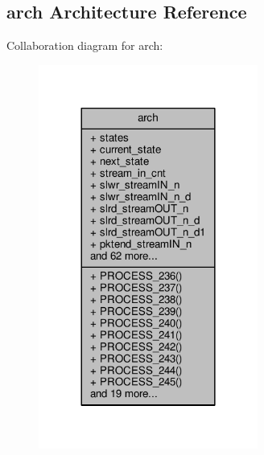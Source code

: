 \subsection{arch Architecture Reference}
\label{classslaveFIFO5b_1_1arch}


Collaboration diagram for arch\+:\nopagebreak
\begin{figure}[H]
\begin{center}
\leavevmode
\includegraphics[width=204pt]{da/d9e/classslaveFIFO5b_1_1arch__coll__graph}
\end{center}
\end{figure}
